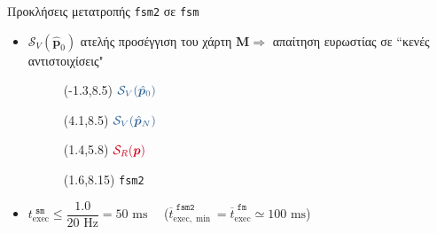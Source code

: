 \begin{frame}{Προκλήσεις μετατροπής \texttt{fsm2} σε \texttt{fsm}}


  \begin{itemize}
    \item $\mathcal{S}_V(\hat{\bm{p}}_0)$ ατελής προσέγγιση του χάρτη $\bm{M} \Rightarrow$ απαίτηση ευρωστίας σε ``κενές αντιστοιχίσεις"
          \vspace{0.3cm}
          \begin{figure}\centering
            \resizebox{4cm}{!}{}
            \begin{textblock}{14}(-1.3,8.5)
              $\textcolor{b}{\mathcal{S}_V(\hat{\bm{p}}_0)}$
            \end{textblock}
            \begin{textblock}{14}(4.1,8.5)
              $\textcolor{b}{\mathcal{S}_V(\hat{\bm{p}}_N)}$
            \end{textblock}
            \begin{textblock}{14}(1.4,5.8)
              $\textcolor{r}{\mathcal{S}_R(\bm{p})}$
            \end{textblock}
            \begin{textblock}{14}(1.6,8.15)
              \tiny \texttt{fsm2}
            \end{textblock}
          \end{figure}
    \item $t_{\text{exec}}^{\texttt{\ sm}} \leq \dfrac{1.0}{20\text{ Hz}} = 50 \text{ ms}$ \ \ ($\overline{t}_{\text{exec},\min}^{\texttt{\ fsm2}} = \overline{t}_{\text{exec}}^{\texttt{\ fm}} \simeq 100 \text{ ms}$)
  \end{itemize}


\end{frame}
